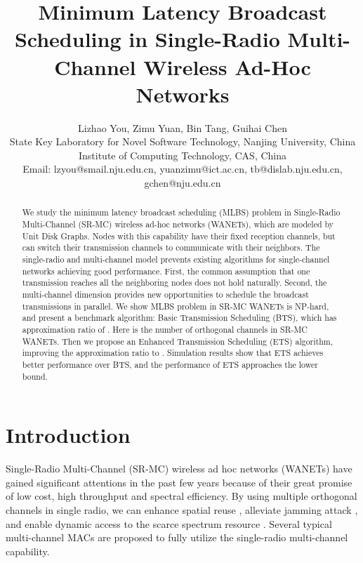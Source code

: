 \documentclass[10pt, conference]{IEEEtran}
\begin{document}
\title{Minimum Latency Broadcast Scheduling in Single-Radio Multi-Channel Wireless Ad-Hoc Networks}


\author{Lizhao You, Zimu Yuan, Bin Tang, Guihai Chen\\
State Key Laboratory for Novel Software Technology, Nanjing University, China \\
Institute of Computing Technology, CAS, China\\
Email: lzyou@smail.nju.edu.cn, yuanzimu@ict.ac.cn, tb@dislab.nju.edu.cn, gchen@nju.edu.cn\\
}













\maketitle


\begin{abstract}
We study the minimum latency broadcast scheduling (MLBS)
problem in Single-Radio Multi-Channel (SR-MC) wireless ad-hoc
networks (WANETs), which are modeled by Unit Disk Graphs. Nodes
with this capability have their fixed reception channels, but
can switch their transmission channels to communicate with
their neighbors. The single-radio and multi-channel model
prevents existing algorithms for single-channel networks
achieving good performance. First, the common assumption
that one transmission reaches all the neighboring nodes does
not hold naturally. Second, the multi-channel dimension
provides new opportunities to schedule the broadcast
transmissions in parallel. We show MLBS problem in SR-MC WANETs
is NP-hard, and present a benchmark algorithm: Basic
Transmission Scheduling (BTS), which has approximation ratio of
. Here  is the number of orthogonal channels in SR-MC
WANETs. Then we propose an Enhanced Transmission Scheduling
(ETS) algorithm, improving the approximation ratio to .
Simulation results show that ETS achieves better
performance over BTS, and the performance of ETS
approaches the lower bound.
\end{abstract}








\IEEEpeerreviewmaketitle




\section{Introduction}
Single-Radio Multi-Channel (SR-MC) wireless ad hoc networks (WANETs) have gained significant attentions in the past few years because of their great promise of low cost, high throughput and spectral efficiency. By using multiple orthogonal channels in single radio, we can enhance spatial reuse \cite{MMSN}, alleviate jamming attack \cite{Jamming}, and enable dynamic access to the scarce spectrum resource \cite{CRAHNs}. Several typical multi-channel MACs \cite{xRDT, CCR-MAC, Quorum} are proposed to fully utilize the single-radio multi-channel capability.
\end{document}
